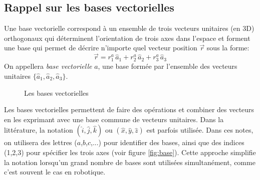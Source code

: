 
\subsection{Rappel sur les bases vectorielles}
\label{vectorbasisrap}
Une base vectorielle correspond à un ensemble de trois vecteurs unitaires (en 3D) orthogonaux qui déterminent l'orientation de trois axes dans l'espace et forment une base qui permet de décrire n'importe quel vecteur position $\vec{r}$ sous la forme:
\begin{equation}
\vec{r} = r_1^a \, \hat{a}_{1} + r_2^a \, \hat{a}_{2} + r_3^a \, \hat{a}_{3}
\label{eq:vecbasisr}
\end{equation} 
On appellera \textit{base vectorielle} $a$, une base formée par l'ensemble des vecteurs unitaires $\{\hat{a}_{1},\hat{a}_{2},\hat{a}_{3}\}$.
%
\begin{figure}[htpb]
        \centering
				\hspace{10pt}
				\hspace{10pt}
        \caption{Les bases vectorielles}
				\label{fig:vecbasis}
\end{figure}

Les bases vectorielles permettent de faire des opérations et combiner des vecteurs en les exprimant avec une base commune de vecteurs unitaires. Dans la littérature, la notation $(\hat{i},\hat{j},\hat{k})$ ou $(\hat{x},\hat{y},\hat{z})$ est parfois utilisée. Dans ces notes, on utilisera des lettres ($a$,$b$,$c$,...) pour identifier des bases, ainsi que des indices (1,2,3) pour spécifier les trois axes (voir figure \ref{fig:base}). Cette approche simplifie la notation lorsqu'un grand nombre de bases sont utilisées simultanément, comme c'est souvent le cas en robotique.

\newpage
{}



